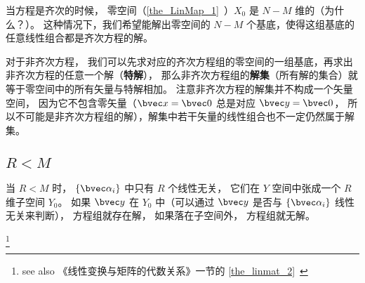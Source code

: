 
当方程是齐次的时候， 零空间（\autoref{the_LinMap_1}~）$X_0$ 是 $N- M$ 维的（为什么？）。 这种情况下，我们希望能解出零空间的 $N - M$ 个基底，使得这组基底的任意线性组合都是齐次方程的解。

对于非齐次方程， 我们可以先求对应的齐次方程组的零空间的一组基底，再求出非齐次方程的任意一个解（\textbf{特解}）， 那么非齐次方程组的\textbf{解集}（所有解的集合）就等于零空间中的所有矢量与特解相加。 注意非齐次方程的解集并不构成一个矢量空间， 因为它不包含零矢量（$\bvec x = \bvec 0$ 总是对应 $\bvec y = \bvec 0$， 所以不可能是非齐次方程组的解），解集中若干矢量的线性组合也不一定仍然属于解集。

\subsection{$R < M$}
当 $R < M$ 时， $\{\bvec \alpha_i\}$ 中只有 $R$ 个线性无关， 它们在 $Y$ 空间中张成一个 $R$ 维子空间 $Y_0$。 如果 $\bvec y$ 在 $Y_0$ 中（可以通过 $\bvec y$ 是否与 $\{\bvec \alpha_i\}$ 线性无关来判断）， 方程组就存在解， 如果落在子空间外， 方程组就无解。

\footnote{see also 《线性变换与矩阵的代数关系》一节的 \autoref{the_linmat_2}~}
